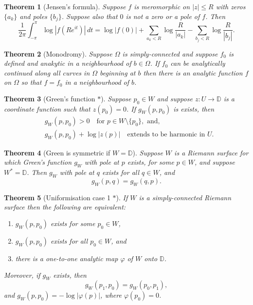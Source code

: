 \documentclass[12pt]{article}
\newtheorem{sats}{Theorem}
\theoremstyle{definition}
\newcommand{\D}{\mathbb{D}}      %
\begin{document}
\begin{sats}[Jensen's formula]
    Suppose $f$ is meromorphic on $|z|\leq R$ with zeros $\{a_k\}$ and poles $\{b_j\}$. Suppose also that $0$ is not a zero or a pole of $f$. Then
    \begin{equation*}
        \frac{1}{2\pi}\int_{-\pi}^\pi \log|f(Re^{it})|\,dt=\log|f(0)|+\sum_{a_k<R}\log\frac{R}{|a_k|}-\sum_{b_j<R}\log\frac{R}{|b_j|}.
    \end{equation*}
\end{sats}

\begin{sats}[Monodromy]
    Suppose $\Omega$ is simply-connected and suppose $f_0$ is defined and anakytic in a neighbourhood of $b\in\Omega$. If $f_0$ can be analytically continued along all curves in $\Omega$ beginning at $b$ then there is an analytic function $f$ on $\Omega$ so that $f=f_0$ in a neighbourhood of $b$.
\end{sats}

\begin{sats}[Green's function $*$]
    Suppose $p_0\in W$ and suppose $z:U\to\D$ is a coordinate function such that $z(p_0)=0$. If $g_W(p,p_0)$ is exists, then 
    \begin{align*}
        &g_W(p,p_0)>0\quad \text{for } p\in W\setminus\{p_0\},\text{ and,}\\
        &g_W(p,p_0)+\log |z(p)|\quad\text{extends to be harmonic in } U.
    \end{align*}
\end{sats}

\begin{sats}[Green is symmetric if $W=\D$]
    Suppose $W$ is a Riemann surface for which Green's function $g_W$ with pole at $p$ exists, for some $p\in W$, and suppose $W^*=\D$. Then $g_W$ with pole at $q$ exists for all $q\in W$, and
    \begin{equation*}
        g_W(p,q)=g_W(q,p).
    \end{equation*}
\end{sats}

\begin{sats}[Uniformisation case 1 $*$]
    If $W$ is a simply-connected Riemann surface then the following are equivalent:
    \begin{enumerate}[label=(\roman*)]
        \item $g_W(p,p_0)$ exists for some $p_0\in W$,
        \item $g_W(p,p_0)$ exists for all $p_0\in W$, and
        \item there is a one-to-one analytic map $\varphi$ of $W$ onto $\D$.
    \end{enumerate}
    Moreover, if $g_W$ exists, then
    \begin{equation*}
        g_W(p_1,p_0)=g_W(p_0,p_1),
    \end{equation*}
    and $g_W(p,p_0)=-\log|\varphi(p)|$, where $\varphi(p_0)=0$.
\end{sats}
\end{document}
